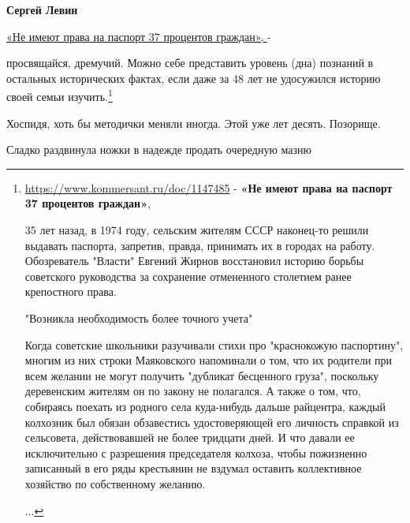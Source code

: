 \begin{itemize}
\begin{itemize}
\textbf{Сергей Левин} 

\href{https://www.kommersant.ru/doc/1147485}{
«Не имеют права на паспорт 37 процентов граждан», 
} - 

просвящайся, дремучий. Можно себе представить уровень (дна) познаний в
остальных исторических фактах, если даже за 48 лет не удосужился историю своей
семьи изучить.\footnote{
\url{https://www.kommersant.ru/doc/1147485} - {\bfseries «Не имеют права на паспорт 37 процентов граждан»}, 

35 лет назад, в 1974 году, сельским жителям СССР наконец-то решили выдавать
паспорта, запретив, правда, принимать их в городах на работу. Обозреватель
"Власти" Евгений Жирнов восстановил историю борьбы советского руководства за
сохранение отмененного столетием ранее крепостного права.

"Возникла необходимость более точного учета"

Когда советские школьники разучивали стихи про "краснокожую паспортину", многим
из них строки Маяковского напоминали о том, что их родители при всем желании не
могут получить "дубликат бесценного груза", поскольку деревенским жителям он по
закону не полагался. А также о том, что, собираясь поехать из родного села
куда-нибудь дальше райцентра, каждый колхозник был обязан обзавестись
удостоверяющей его личность справкой из сельсовета, действовавшей не более
тридцати дней. И что давали ее исключительно с разрешения председателя колхоза,
чтобы пожизненно записанный в его ряды крестьянин не вздумал оставить
коллективное хозяйство по собственному желанию.

...
}



\end{itemize}

 
Хоспидя, хоть бы методички меняли иногда. Этой уже лет десять. Позорище.

 
Сладко раздвинула ножки в надежде продать очередную мазню

 

\end{itemize}
